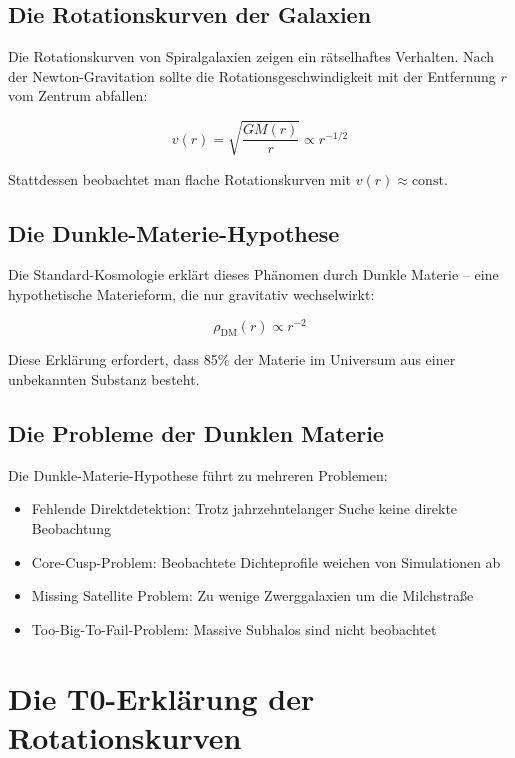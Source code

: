 \documentclass[12pt,a4paper]{report}
\begin{document}
	\subsection{Die Rotationskurven der Galaxien}
	
	Die Rotationskurven von Spiralgalaxien zeigen ein rätselhaftes Verhalten. Nach der Newton-Gravitation sollte die Rotationsgeschwindigkeit mit der Entfernung $r$ vom Zentrum abfallen:
	
	\begin{equation}
		v(r) = \sqrt{\frac{GM(r)}{r}} \propto r^{-1/2}
	\end{equation}
	
	Stattdessen beobachtet man flache Rotationskurven mit $v(r) \approx \text{const}$.
	
	\subsection{Die Dunkle-Materie-Hypothese}
	
	Die Standard-Kosmologie erklärt dieses Phänomen durch Dunkle Materie -- eine hypothetische Materieform, die nur gravitativ wechselwirkt:
	
	\begin{equation}
		\rho_{\text{DM}}(r) \propto r^{-2}
	\end{equation}
	
	Diese Erklärung erfordert, dass 85\% der Materie im Universum aus einer unbekannten Substanz besteht.
	
	\subsection{Die Probleme der Dunklen Materie}
	
	Die Dunkle-Materie-Hypothese führt zu mehreren Problemen:
	
	\begin{itemize}
		\item Fehlende Direktdetektion: Trotz jahrzehntelanger Suche keine direkte Beobachtung
		\item Core-Cusp-Problem: Beobachtete Dichteprofile weichen von Simulationen ab
		\item Missing Satellite Problem: Zu wenige Zwerggalaxien um die Milchstraße
		\item Too-Big-To-Fail-Problem: Massive Subhalos sind nicht beobachtet
	\end{itemize}
	
	\section{Die T0-Erklärung der Rotationskurven}
	
\end{document}
